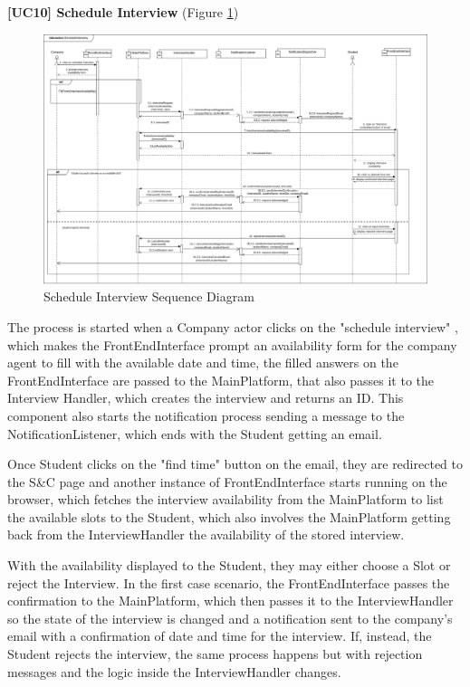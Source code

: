 \textbf{[UC10] Schedule Interview} (Figure \ref{fig:schedulesequence})
\begin{figure}[H]
\centering
\includegraphics[width=\textwidth]{Images/schedule-interview-sequence.png}
\caption{\label{fig:schedulesequence} Schedule Interview Sequence Diagram}
\end{figure}


The process is started when a Company actor clicks on the "schedule interview" , which makes the FrontEndInterface prompt an availability form for the company agent to fill with the available date and time, the filled answers on the FrontEndInterface are passed to the MainPlatform, that also passes it to the Interview Handler, which creates the interview and returns an ID. This component also starts the notification process sending a message to the NotificationListener, which ends with the Student getting an email.

Once Student clicks on the "find time" button on the email, they are redirected to the S\&C page and another instance of FrontEndInterface starts running on the browser, which fetches the interview availability from the MainPlatform to list the available slots to the Student, which also involves the MainPlatform getting back from the InterviewHandler the availability of the stored interview.

With the availability displayed to the Student, they may either choose a Slot or reject the Interview. In the first case scenario, the FrontEndInterface passes the confirmation to the MainPlatform, which then passes it to the InterviewHandler so the state of the interview is changed and a notification sent to the company's email with a confirmation of date and time for the interview. If, instead, the Student rejects the interview, the same process happens but with rejection messages and the logic inside the InterviewHandler changes.

